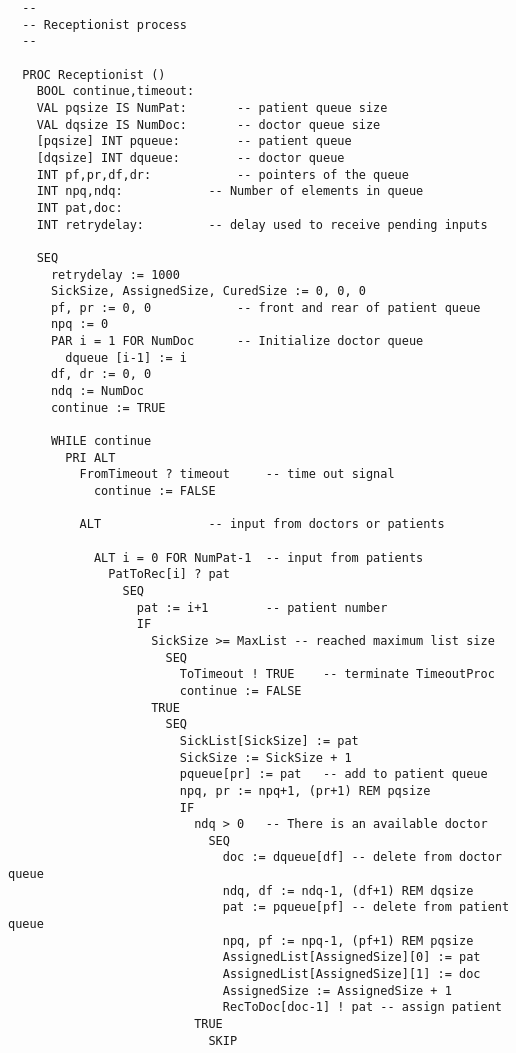 \begin{small}
\begin{verbatim}
  --
  -- Receptionist process
  --

  PROC Receptionist ()
    BOOL continue,timeout:
    VAL pqsize IS NumPat:		-- patient queue size
    VAL dqsize IS NumDoc:		-- doctor queue size
    [pqsize] INT pqueue:		-- patient queue
    [dqsize] INT dqueue:		-- doctor queue
    INT pf,pr,df,dr:			-- pointers of the queue
    INT npq,ndq:			-- Number of elements in queue
    INT pat,doc:
    INT retrydelay:			-- delay used to receive pending inputs

    SEQ
      retrydelay := 1000
      SickSize, AssignedSize, CuredSize := 0, 0, 0
      pf, pr := 0, 0			-- front and rear of patient queue
      npq := 0
      PAR i = 1 FOR NumDoc		-- Initialize doctor queue
        dqueue [i-1] := i
      df, dr := 0, 0
      ndq := NumDoc
      continue := TRUE

      WHILE continue
        PRI ALT
          FromTimeout ? timeout		-- time out signal
            continue := FALSE

          ALT				-- input from doctors or patients

            ALT i = 0 FOR NumPat-1	-- input from patients
              PatToRec[i] ? pat
                SEQ
                  pat := i+1		-- patient number
                  IF
                    SickSize >= MaxList	-- reached maximum list size
                      SEQ
                        ToTimeout ! TRUE	-- terminate TimeoutProc
                        continue := FALSE
                    TRUE
                      SEQ
                        SickList[SickSize] := pat
                        SickSize := SickSize + 1
                        pqueue[pr] := pat	-- add to patient queue
                        npq, pr := npq+1, (pr+1) REM pqsize
                        IF
                          ndq > 0	-- There is an available doctor
                            SEQ
                              doc := dqueue[df]	-- delete from doctor queue
                              ndq, df := ndq-1, (df+1) REM dqsize
                              pat := pqueue[pf] -- delete from patient queue
                              npq, pf := npq-1, (pf+1) REM pqsize
                              AssignedList[AssignedSize][0] := pat
                              AssignedList[AssignedSize][1] := doc
                              AssignedSize := AssignedSize + 1
                              RecToDoc[doc-1] ! pat	-- assign patient
                          TRUE
                            SKIP
         

\end{verbatim}
\end{small}
